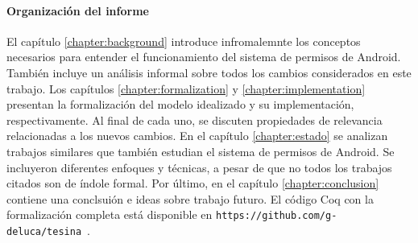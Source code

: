 \paragraph{Organización del informe}
El capítulo \ref{chapter:background} introduce infromalemnte los conceptos necesarios para entender
el funcionamiento del sistema de permisos de Android. También incluye un análisis informal sobre
todos los cambios considerados en este trabajo. Los capítulos \ref{chapter:formalization} y
\ref{chapter:implementation} presentan la formalización del modelo idealizado y su implementación,
respectivamente. Al final de cada uno, se discuten propiedades de relevancia relacionadas a los
nuevos cambios. En el capítulo \ref{chapter:estado} se analizan trabajos similares que también
estudian el sistema de permisos de Android. Se incluyeron diferentes enfoques y técnicas, a pesar de
que no todos los trabajos citados son de índole formal. Por último, en el capítulo
\ref{chapter:conclusion} contiene una conclsuión e ideas sobre trabajo futuro. El código Coq con la
formalización completa está disponible en
\texttt{https://github.com/g-deluca/tesina}~\cite{github-code}.